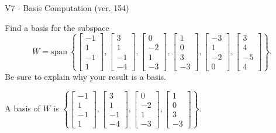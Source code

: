 \begin{exercise}
  \begin{exerciseTitle}V7 - Basis Computation (ver. 154)\end{exerciseTitle}
  \begin{exerciseStatement}
    Find a basis for the subspace 
\[W=\mathrm{span}\ \left\{\left[\begin{array}{r}
-1 \\
1 \\
-1 \\
1
\end{array}\right] , \left[\begin{array}{r}
3 \\
1 \\
-1 \\
-4
\end{array}\right] , \left[\begin{array}{r}
0 \\
-2 \\
1 \\
-3
\end{array}\right] , \left[\begin{array}{r}
1 \\
0 \\
3 \\
-3
\end{array}\right] , \left[\begin{array}{r}
-3 \\
1 \\
-2 \\
0
\end{array}\right] , \left[\begin{array}{r}
3 \\
4 \\
-5 \\
4
\end{array}\right]\right\}.\]
 Be sure to explain why your result is a basis.


  \end{exerciseStatement}
  \begin{exerciseAnswer}
   A basis of \(W\) is  \(\left\{\left[\begin{array}{r}
-1 \\
1 \\
-1 \\
1
\end{array}\right] , \left[\begin{array}{r}
3 \\
1 \\
-1 \\
-4
\end{array}\right] , \left[\begin{array}{r}
0 \\
-2 \\
1 \\
-3
\end{array}\right] , \left[\begin{array}{r}
1 \\
0 \\
3 \\
-3
\end{array}\right]\right\}\).
  


  \end{exerciseAnswer}
\end{exercise}